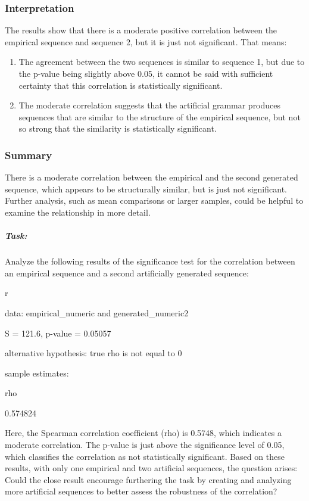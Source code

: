 \documentclass[
]{article}
\begin{document}
\subsubsection{\texorpdfstring{\textbf{Interpretation}}{Interpretation}}\label{interpretation}

The results show that there is a moderate positive correlation between
the empirical sequence and sequence 2, but it is just not significant.
That means:

\begin{enumerate}
\def\labelenumi{\arabic{enumi}.}
\item
  The agreement between the two sequences is similar to sequence 1, but
  due to the p-value being slightly above 0.05, it cannot be said with
  sufficient certainty that this correlation is statistically
  significant.
\item
  The moderate correlation suggests that the artificial grammar produces
  sequences that are similar to the structure of the empirical sequence,
  but not so strong that the similarity is statistically significant.
\end{enumerate}

\subsubsection{\texorpdfstring{\textbf{Summary}}{Summary}}\label{summary}

There is a moderate correlation between the empirical and the second
generated sequence, which appears to be structurally similar, but is
just not significant. Further analysis, such as mean comparisons or
larger samples, could be helpful to examine the relationship in more
detail.

\subparagraph{\texorpdfstring{ \textbf{Task:}}{ Task:}}\label{task-6}

Analyze the following results of the significance test for the
correlation between an empirical sequence and a second artificially
generated sequence:

r

data: empirical\_numeric and generated\_numeric2

S = 121.6, p-value = 0.05057

alternative hypothesis: true rho is not equal to 0

sample estimates:

rho

0.574824

Here, the Spearman correlation coefficient (rho) is 0.5748, which
indicates a moderate correlation. The p-value is just above the
significance level of 0.05, which classifies the correlation as not
statistically significant. Based on these results, with only one
empirical and two artificial sequences, the question arises: Could the
close result encourage furthering the task by creating and analyzing
more artificial sequences to better assess the robustness of the
correlation?
\end{document}
